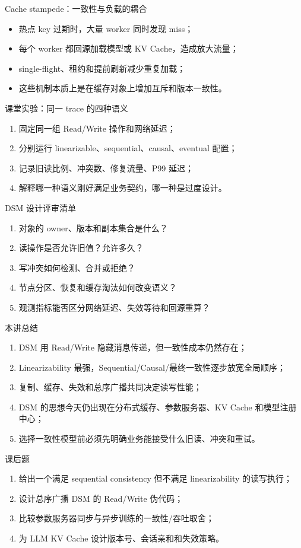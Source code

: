 \documentclass[UTF8,fontset=none,aspectratio=169,10pt]{beamer}
\begin{document}
\begin{frame}{Cache stampede：一致性与负载的耦合}
\begin{itemize}
  \item 热点 key 过期时，大量 worker 同时发现 miss；
  \item 每个 worker 都回源加载模型或 KV Cache，造成放大流量；
  \item single-flight、租约和提前刷新减少重复加载；
  \item 这些机制本质上是在缓存对象上增加互斥和版本一致性。
\end{itemize}
\end{frame}

\begin{frame}{课堂实验：同一 trace 的四种语义}
\begin{enumerate}
  \item 固定同一组 Read/Write 操作和网络延迟；
  \item 分别运行 linearizable、sequential、causal、eventual 配置；
  \item 记录旧读比例、冲突数、修复流量、P99 延迟；
  \item 解释哪一种语义刚好满足业务契约，哪一种是过度设计。
\end{enumerate}
\end{frame}

\begin{frame}{DSM 设计评审清单}
\begin{enumerate}
  \item 对象的 owner、版本和副本集合是什么？
  \item 读操作是否允许旧值？允许多久？
  \item 写冲突如何检测、合并或拒绝？
  \item 节点分区、恢复和缓存淘汰如何改变语义？
  \item 观测指标能否区分网络延迟、失效等待和回源重算？
\end{enumerate}
\end{frame}

\begin{frame}{本讲总结}
\begin{enumerate}
  \item DSM 用 Read/Write 隐藏消息传递，但一致性成本仍然存在；
  \item Linearizability 最强，Sequential/Causal/最终一致性逐步放宽全局顺序；
  \item 复制、缓存、失效和总序广播共同决定读写性能；
  \item DSM 的思想今天仍出现在分布式缓存、参数服务器、KV Cache 和模型注册中心；
  \item 选择一致性模型前必须先明确业务能接受什么旧读、冲突和重试。
\end{enumerate}
\vfill
{}
\end{frame}

\begin{frame}{课后题}
\begin{enumerate}
  \item 给出一个满足 sequential consistency 但不满足 linearizability 的读写执行；
  \item 设计总序广播 DSM 的 Read/Write 伪代码；
  \item 比较参数服务器同步与异步训练的一致性/吞吐取舍；
  \item 为 LLM KV Cache 设计版本号、会话亲和和失效策略。
\end{enumerate}
\end{frame}
\end{document}
